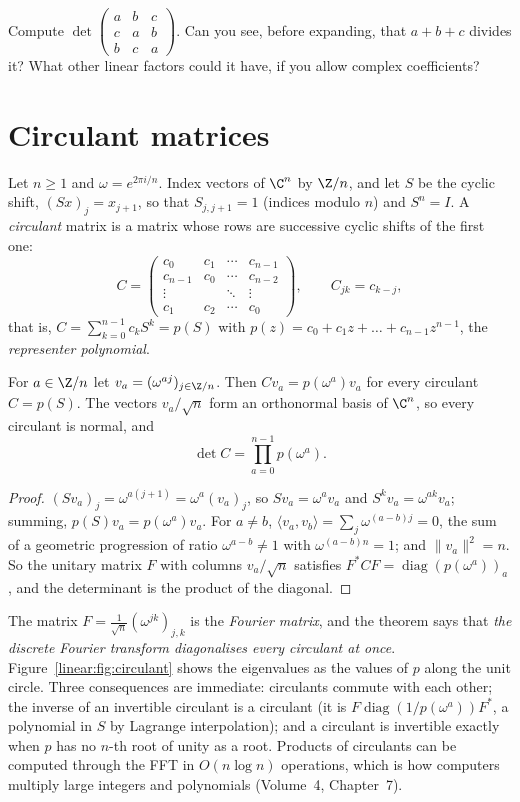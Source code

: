 \begin{think}
Compute $\det\begin{pmatrix}a&b&c\\c&a&b\\b&c&a\end{pmatrix}$. Can you see, before expanding, that $a+b+c$ divides it? What
other linear factors could it have, if you allow complex coefficients?
\end{think}

\section{Circulant matrices}

Let $n\ge1$ and $\omega=e^{2\pi i/n}$. Index vectors of $\C^n$ by $\Z/n$, and let $S$ be the cyclic shift, $(Sx)_j=x_{j+1}$, so
that $S_{j,j+1}=1$ (indices modulo $n$) and $S^n=I$. A \emph{circulant} matrix is a matrix whose rows are successive cyclic shifts
of the first one:
\[
C=\begin{pmatrix}c_0&c_1&\cdots&c_{n-1}\\c_{n-1}&c_0&\cdots&c_{n-2}\\\vdots&&\ddots&\vdots\\c_1&c_2&\cdots&c_0\end{pmatrix},
\qquad C_{jk}=c_{k-j},
\]
that is, $C=\sum_{k=0}^{n-1}c_kS^k=p(S)$ with $p(z)=c_0+c_1z+\dots+c_{n-1}z^{n-1}$, the \emph{representer polynomial}.

\begin{theorem}\label{linear:thm:circulant}
For $a\in\Z/n$ let $v_a=(\omega^{aj})_{j\in\Z/n}$. Then $Cv_a=p(\omega^a)v_a$ for every circulant $C=p(S)$. The vectors
$v_a/\sqrt n$ form an orthonormal basis of $\C^n$, so every circulant is normal, and
\[
\det C=\prod_{a=0}^{n-1}p(\omega^a).
\]
\end{theorem}
\begin{proof}
$(Sv_a)_j=\omega^{a(j+1)}=\omega^a(v_a)_j$, so $Sv_a=\omega^av_a$ and $S^kv_a=\omega^{ak}v_a$; summing, $p(S)v_a=p(\omega^a)v_a$.
For $a\ne b$, $\langle v_a,v_b\rangle=\sum_j\omega^{(a-b)j}=0$, the sum of a geometric progression of ratio $\omega^{a-b}\ne1$
with $\omega^{(a-b)n}=1$; and $\|v_a\|^2=n$. So the unitary matrix $F$ with columns $v_a/\sqrt n$ satisfies $F^*CF=\operatorname
{diag}(p(\omega^a))_a$, and the determinant is the product of the diagonal.
\end{proof}

The matrix $F=\frac1{\sqrt n}(\omega^{jk})_{j,k}$ is the \emph{Fourier matrix}, and the theorem says that \emph{the discrete Fourier
transform diagonalises every circulant at once}. Figure~\ref{linear:fig:circulant} shows the eigenvalues as the values of $p$ along the
unit circle. Three consequences are immediate: circulants commute with each other; the inverse of an invertible circulant is a
circulant (it is $F\operatorname{diag}(1/p(\omega^a))F^*$, a polynomial in $S$ by Lagrange interpolation); and a circulant is
invertible exactly when $p$ has no $n$-th root of unity as a root. Products of circulants can be computed through the FFT in
$O(n\log n)$ operations, which is how computers multiply large integers and polynomials (Volume~4, Chapter~7).

